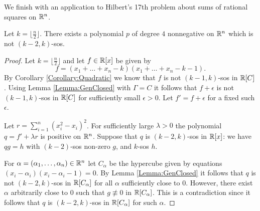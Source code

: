 We finish with an application to Hilbert's 17th problem about sums of rational squares on $\mathbb{R}^n$.

\begin{theorem} \label{Theorem:Global}
Let $k=\lfloor \frac{n}{2}\rfloor$. There exists a polynomial $p$ of degree $4$ nonnegative on $\mathbb{R}^n$ which is not $(k-2,k)$-sos.
\end{theorem}
\begin{proof}
Let $k=\lfloor \frac{n}{2}\rfloor$ and let $f\in \mathbb{R}[x]$ be given by $$f=(x_1+\dots+x_n-k)(x_1+\dots+x_n-k-1).$$
By Corollary \ref{Corollary:Quadratic} we know that $f$ is not $(k-1,k)$-sos in $\mathbb{R}[C]$. Using Lemma \ref{Lemma:GenClosed} with $\Gamma = C$ it follows that $f+\epsilon$ is not $(k-1,k)$-sos in $\mathbb{R}[C]$ for sufficiently small $\epsilon>0$. Let $f'=f+\epsilon$ for a fixed such $\epsilon$.

Let $r=\sum_{i=1}^n (x_i^2-x_i)^2$. For sufficiently large $\lambda>0$ the polynomial $q=f'+\lambda r$ is positive on $\mathbb{R}^n$. 
Suppose that $q$ is $(k-2,k)$-sos in $\mathbb{R}[x]$: we have $qg=h$ with $(k-2)$-sos non-zero $g$, and $k$-sos $h$. 


For $\alpha=(\alpha_1,\dots,\alpha_n) \in \mathbb{R}^n$ let $C_{\alpha}$ be the hypercube given by equations $(x_i-\alpha_i)(x_i-\alpha_i-1)=0$. By Lemma \ref{Lemma:GenClosed} it follows that $q$ is not $(k-2,k)$-sos in $\mathbb{R}[C_{\alpha}]$ for all $\alpha$ sufficiently close to $0$. However, there exist $\alpha$ arbitrarily close to $0$ such that $g \not \equiv 0$ in $\mathbb{R}[C_{\alpha}]$. This is a contradiction since it follows that $q$ is $(k-2,k)$-sos in $\mathbb{R}[C_\alpha]$ for such $\alpha$.
\end{proof}
